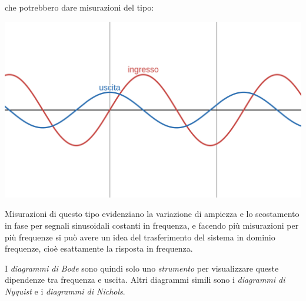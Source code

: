 \documentclass[a4paper,11pt]{article}
\begin{document}
\begin{center}
\end{center}

che potrebbero dare misurazioni del tipo:

\begin{center}
	\includegraphics[scale=0.3]{../figures/in_out_sin.png}
\end{center}

Misurazioni di questo tipo evidenziano la variazione di ampiezza e lo scostamento in fase per segnali sinusoidali costanti in frequenza, e facendo più misurazioni per più frequenze si può avere un idea del trasferimento del sistema in dominio frequenze, cioè esattamente la risposta in frequenza.

I \textit{diagrammi di Bode} sono quindi solo uno \textit{strumento} per visualizzare queste dipendenze tra frequenza e uscita.
Altri diagrammi simili sono i \textit{diagrammi di Nyquist} e i \textit{diagrammi di Nichols}.
\end{document}
